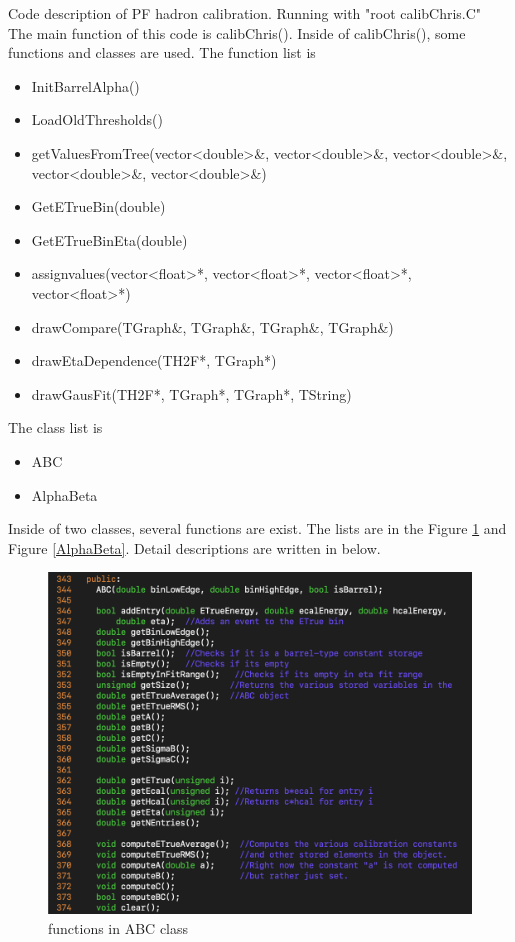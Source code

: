 \documentclass{cernrep}
\begin{document}
Code description of PF hadron calibration. Running with "root calibChris.C" \\
The main function of this code is calibChris(). Inside of calibChris(), some functions and classes are used. The function list is 
\begin{itemize}
\item InitBarrelAlpha()
\item LoadOldThresholds()
\item getValuesFromTree(vector<double>\&, vector<double>\&, vector<double>\&, vector<double>\&, vector<double>\&)
\item GetETrueBin(double)
\item GetETrueBinEta(double)
\item assignvalues(vector<float>*, vector<float>*, vector<float>*, vector<float>*)
\item drawCompare(TGraph\&, TGraph\&, TGraph\&, TGraph\&)
\item drawEtaDependence(TH2F*, TGraph*)
\item drawGausFit(TH2F*, TGraph*, TGraph*, TString)
\end{itemize}

The class list is

\begin{itemize}
\item ABC
\item AlphaBeta
\end{itemize}

Inside of two classes, several functions are exist. The lists are in the Figure \ref{ABC} and Figure \ref{AlphaBeta}. Detail descriptions are written in below.

\begin{figure}[!]
\includegraphics[width=1.0\textwidth]{fig/ABC.png}
\caption{functions in ABC class}
\label{ABC}
\end{figure}
\end{document}
